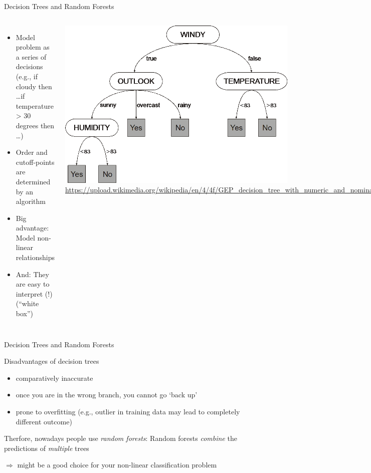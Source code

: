 \documentclass{beamer}
\begin{document}
\begin{frame}{Decision Trees and Random Forests}

\begin{columns}
	\begin{itemize}[<+->]
		\item Model problem as a series of decisions (e.g., if cloudy then \ldots if temperature > 30 degrees then \ldots)
		\item Order and cutoff-points are determined by an algorithm
		\item Big advantage: Model non-linear relationships
		\item And: They are easy to interpret (!) (``white box'')
	\end{itemize}
	
	\includegraphics[width=.8\linewidth,height=.5\paperheight,keepaspectratio]{../../pictures/decisiontree}
	\tiny{\url{https://upload.wikimedia.org/wikipedia/en/4/4f/GEP\_decision\_tree\_with\_numeric\_and\_nominal\_attributes.png}}
	
\end{columns}

\end{frame}



\begin{frame}{Decision Trees and Random Forests}

\begin{block}{Disadvantages of decision trees}
\begin{itemize}
	\item comparatively inaccurate
	\item once you are in the wrong branch, you cannot go `back up'
	\item prone to overfitting (e.g., outlier in training data may lead to completely different outcome)
\end{itemize}
\end{block}

\pause

Therfore, nowadays people use \emph{random forests}: Random forests \emph{combine} the predictions of \emph{multiple} trees

$\Rightarrow$ might be a good choice for your non-linear classification problem

\end{frame}
\end{document}

